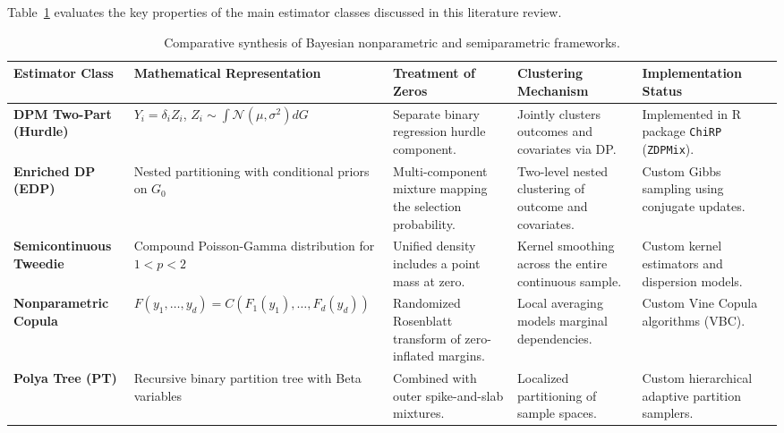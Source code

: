 \documentclass[11pt, a4paper]{article}
\begin{document}
Table~\ref{tab:frameworks} evaluates the key properties of the main estimator classes discussed in this literature review.

\begin{table}[htbp]
\centering
\caption{Comparative synthesis of Bayesian nonparametric and semiparametric frameworks.}
\label{tab:frameworks}
\small
\begin{tabularx}{\textwidth}{p{3.2cm} X X X p{2.8cm}}
\toprule
\textbf{Estimator Class} & \textbf{Mathematical Representation} & \textbf{Treatment of Zeros} & \textbf{Clustering Mechanism} & \textbf{Implementation Status} \\
\midrule
\textbf{DPM Two-Part (Hurdle)} \cite{olsen2001, muller2004, oganisian2020} & 
$Y_i = \delta_i Z_i$, $Z_i \sim \int \mathcal{N}(\mu, \sigma^2) dG$ & 
Separate binary regression hurdle component.\cite{olsen2001, oganisian2020} & 
Jointly clusters outcomes and covariates via DP.\cite{oganisian2020} & 
Implemented in R package \texttt{ChiRP} (\texttt{ZDPMix}).\cite{oganisianpkg} \\
\addlinespace
\textbf{Enriched DP (EDP)} \cite{oganisian2021, wade2011} & 
Nested partitioning with conditional priors on $G_0$ & 
Multi-component mixture mapping the selection probability.\cite{wade2011} & 
Two-level nested clustering of outcome and covariates.\cite{wade2011} & 
Custom Gibbs sampling using conjugate updates.\cite{wade2011} \\
\addlinespace
\textbf{Semicontinuous Tweedie} \cite{albert2005, kokonendji2021} & 
Compound Poisson-Gamma distribution for $1 < p < 2$ & 
Unified density includes a point mass at zero.\cite{kokonendji2021, tweedie1984} & 
Kernel smoothing across the entire continuous sample.\cite{kokonendji2021} & 
Custom kernel estimators and dispersion models.\cite{kokonendji2021} \\
\addlinespace
\textbf{Nonparametric Copula} \cite{craiu2012, schepsmeier2016} & 
$F(y_1, \dots, y_d) = C(F_1(y_1), \dots, F_d(y_d))$ & 
Randomized Rosenblatt transform of zero-inflated margins.\cite{schepsmeier2016} & 
Local averaging models marginal dependencies.\cite{craiu2012} & 
Custom Vine Copula algorithms (VBC).\cite{schepsmeier2016} \\
\addlinespace
\textbf{Polya Tree (PT)} \cite{lavine1992} & 
Recursive binary partition tree with Beta variables & 
Combined with outer spike-and-slab mixtures.\cite{hanson2006} & 
Localized partitioning of sample spaces.\cite{lavine1992} & 
Custom hierarchical adaptive partition samplers.\cite{lavine1992} \\
\bottomrule
\end{tabularx}
\end{table}
\end{document}
